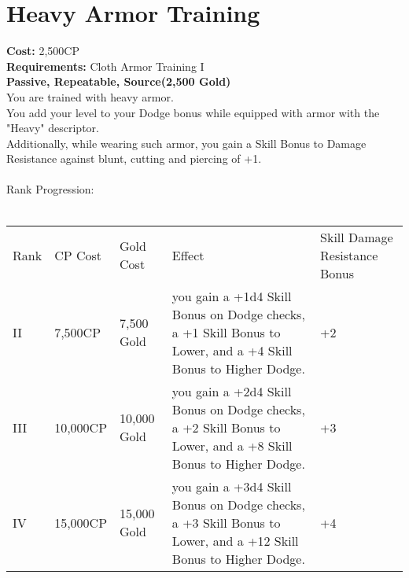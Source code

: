 \section{Heavy Armor Training}\label{perk:heavyArmorTraining}
\textbf{Cost:} 2,500CP\\
\textbf{Requirements:} Cloth Armor Training I\\
\textbf{Passive, Repeatable, Source(2,500 Gold)}\\
You are trained with heavy armor.\\
You add your level to your Dodge bonus while equipped with armor with the "Heavy" descriptor.\\
Additionally, while wearing such armor, you gain a Skill Bonus to Damage Resistance against blunt, cutting and piercing of +1.\\
\\

Rank Progression:\\
\\
\begin{tabular}{l | l | l | l | l}
    Rank & CP Cost & Gold Cost & Effect & Skill Damage Resistance Bonus \\
    II
    & 7,500CP
    & 7,500 Gold
    & you gain a +1d4 Skill Bonus on Dodge checks, a +1 Skill Bonus to Lower, and a +4 Skill Bonus to Higher Dodge.
    & +2
    \\
    III
    & 10,000CP
    & 10,000 Gold
    & you gain a +2d4 Skill Bonus on Dodge checks, a +2 Skill Bonus to Lower, and a +8 Skill Bonus to Higher Dodge.
    & +3
    \\
    IV
    & 15,000CP
    & 15,000 Gold
    & you gain a +3d4 Skill Bonus on Dodge checks, a +3 Skill Bonus to Lower, and a +12 Skill Bonus to Higher Dodge.
    & +4
    \\
\end{tabular}